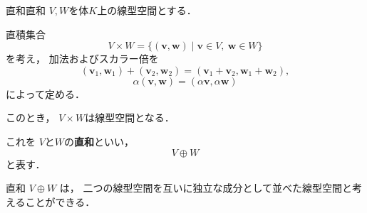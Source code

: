 \begin{definition}{直和}{直和}
  $V,W$を体$K$上の線型空間とする．

  直積集合
  \[
  V\times W
  =
  \{
  (\bm{v},\bm{w})
  \mid
  \bm{v}\in V,\
  \bm{w}\in W
  \}
  \]
  を考え，
  加法およびスカラー倍を
  \[
  (\bm{v}_1,\bm{w}_1)+(\bm{v}_2,\bm{w}_2)
  =
  (\bm{v}_1+\bm{v}_2,\bm{w}_1+\bm{w}_2),
  \]
  \[
  \alpha(\bm{v},\bm{w})
  =
  (\alpha \bm{v},\alpha \bm{w})
  \]
  によって定める．

  このとき，
  $V\times W$は線型空間となる．

  これを
  $V$と$W$の\textbf{直和}といい，
  \[
  V\oplus W
  \]
  と表す．
\end{definition}

\begin{mycolumn}
直和
$V\oplus W$
は，
二つの線型空間を互いに独立な成分として並べた線型空間と考えることができる．
\end{mycolumn}